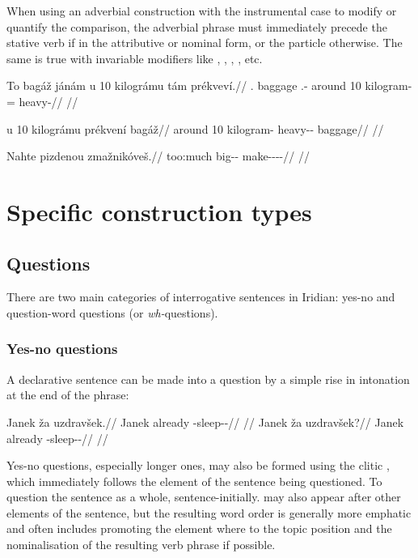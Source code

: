 When using an adverbial construction with the instrumental case to modify or quantify the comparison, the adverbial phrase must immediately precede the stative verb if in the attributive or nominal form, or the particle  otherwise. The same is true with invariable modifiers like , , , , etc.

\ex
\begingl
\gla To bagáž jánám u 10 kilográmu tám prékveví.//
\glb \Dem{}.\Prox{} baggage \Dem{}.\Med{}-\Agt{} around 10 kilogram-\Ins{} \Comp{}= heavy-\Cont{}//
\glft {}//
\endgl
\xe

\ex
\begingl
\gla u 10 kilográmu prékvení bagáž//
\glb around 10 kilogram-\Ins{} heavy-\Comp{}-\Att{} baggage//
\glft {}//
\endgl
\xe

\ex
\begingl
\gla Nahte pizdenou zmažnikóveš.//
\glb too:much big-\Comp{}-\Nz{} make-\Pv{}-\Pf{}-\Nz{}-\Second{}\Sg{}//
\glft {}//
\endgl
\xe

\section{Specific construction types}
\subsection{Questions}

There are two  main  categories  of  interrogative  sentences in Iridian: yes-no  and  question-word questions (or \emph{wh-}questions).

\subsubsection{Yes-no questions}

A declarative sentence can be made into a question by a simple rise in intonation at the end of the phrase:

\pex
\a
\begingl
\gla Janek ža uzdravšek.//
\glb Janek already \Refl{}-sleep-\Av{}-\Pf{}//
\glft {}//
\endgl
\a
\begingl
\gla Janek ža uzdravšek?//
\glb Janek already \Refl{}-sleep-\Av{}-\Pf{}//
\glft {}//
\endgl
\xe

Yes-no questions, especially longer ones, may also be formed using the clitic , which immediately follows the element of the sentence being questioned. To question the sentence as a whole,  sentence-initially.  may also appear after other elements of the sentence, but the resulting word order is generally more emphatic and often includes promoting the element where  to the topic position and the nominalisation of the resulting verb phrase if possible.


